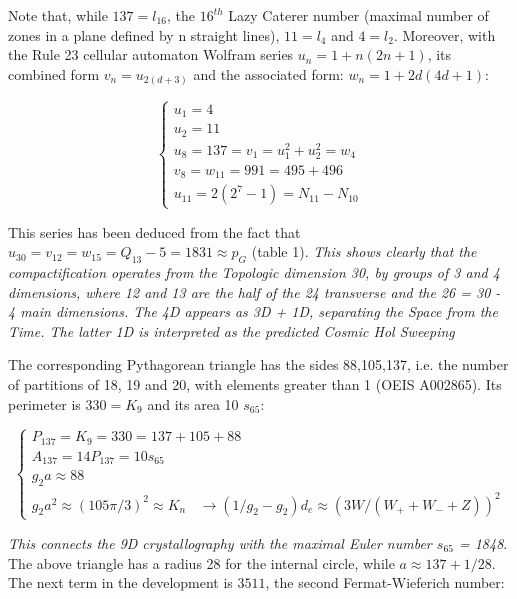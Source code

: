 \documentclass[a4paper,9pt]{article}
\newcounter{row}
\begin{document}
Note that, while $137 = l_{16}$, the $16^{th}$ Lazy Caterer number (maximal number of zones in a plane defined by n straight lines), $11 = l_4$ and $4 = l_2$. Moreover, with the Rule 23 cellular automaton Wolfram series $u_n = 1 + n(2n+1)$, its combined form $v_n = u_{2(d+3)}$ and the associated form: $w_n = 1 + 2d(4d+1)$:

\begin{equation}
 \left\{
    \begin{array}{ll}
  u_1 = 4 \\
 u_2 = 11\\
 u_8 = 137 = v_1 = u_1^2 + u_2^2 = w_4 \\

 v_8 = w_{11} = 991 = 495 + 496 \\
 u_{11} = 2 (2^7-1) = N_{11} -N_{10}
    \end{array}
\right.
\end{equation}

This series has been deduced from the fact that $u_30 = v_{12} = w_{15} = Q_{13}-5  = 1831 \approx p_G$ (table 1). \textit{This shows clearly that the compactification operates from the Topologic dimension 30, by groups of 3 and 4 dimensions, where 12 and 13 are the half of the 24 transverse and the 26 = 30 - 4 main dimensions. The 4D appears as 3D + 1D, separating the Space from the Time. The latter 1D is interpreted as the predicted Cosmic Hol Sweeping \cite {Sanchez1}} 

The corresponding Pythagorean triangle has the sides 88,105,137, i.e. the number of partitions of 18, 19 and 20, with elements greater than 1 (OEIS A002865). Its perimeter is $330 = K_9$ and its area 10 $s_{65}$:


\begin{equation}
 \left\{
    \begin{array}{ll}
   P_{137} = K_9 = 330 = 137 + 105 + 88 \\
 A_{137}  = 14 P_{137} = 10 s_{65} \\
g_2 a \approx 88  \\
g_2 a^2 \approx (105 \pi/3)^2 \approx K_n  ~~~~ \rightarrow (1/g_2 - g_2)d_e \approx (3W/(W_+ + W_- + Z))^2 
    \end{array}
\right.
\end{equation}

\textit{This connects the 9D crystallography with the maximal Euler number $s_{65}$ = 1848}. The above triangle has a radius 28 for the internal circle, while $a \approx 137 + 1/28$. The next term in the development is $3511 $, the second Fermat-Wieferich number: \cite{Ribenboim}
\end{document}
